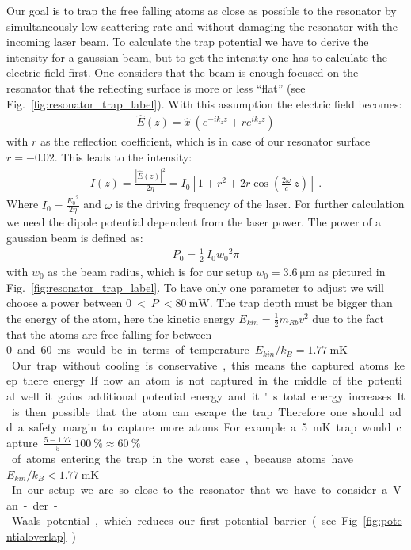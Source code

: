 Our goal is to trap the free falling atoms as close as possible to the resonator by
simultaneously low scattering rate and without damaging the resonator with the incoming
laser beam. To calculate the trap potential we have to derive the intensity for a
gaussian beam, but to get the intensity one has to calculate the electric field first.
One considers that the beam is enough focused on the resonator that the reflecting
surface is more or less ``flat'' (see Fig.~\ref{fig:resonator_trap_label}). With this 
assumption the electric field becomes:
\begin{align}
    \hat{E}(z) = \hat{x}~\left( e^{-i k_z z} + r e^{i k_z z} \right)
\end{align}
with \(r \) as the reflection coefficient, which is in case of our resonator surface
\(r = -0.02 \). This leads to the intensity:
\begin{align}
    I(z) = \frac{ { | \hat{E}(z) | }^2}{2\eta} =
    I_0 \left [ 1 + r^2 + 2r \cos{\left( \frac{2\omega}{c}~z \right) } \right ]~.
\end{align}
Where \(I_0 = \frac{{E_0}^2}{2\eta} \) and \(\omega \) is the driving frequency of the
laser. For further calculation we need the dipole potential dependent from the laser power.
The power of a gaussian beam is defined as:
\begin{align}
    P_0 = \frac{1}{2}~I_0 {w_0}^2 \pi
\end{align} 
with \(w_0 \) as the beam radius, which is for our setup \(w_0 = \SI{3.6}{\micro\meter} \) 
as pictured in Fig.~\ref{fig:resonator_trap_label}.
To have only one parameter to adjust we will choose a power between 
\(0~<~P~<\SI{80}{\milli\watt} \). The trap depth must be bigger than the energy of the
atom, here the kinetic energy \(E_{kin} = \frac{1}{2}m_{Rb} v^2 \) due to the fact that 
the atoms are free falling for between \SI{0} and \SI{60}{\milli\second} would be in terms of temperature 
\(E_{kin}/k_B = \SI{1.77}{\milli\kelvin} \). Our trap without cooling 
is conservative, this means the captured atoms keep there energy. If now an
atom is not captured in the middle of the potential well it gains additional 
potential energy and it's total energy increases. It is then possible that
the atom can escape the trap. Therefore one should add a safety margin to
capture more atoms. For example a \SI{5}{\milli\kelvin} trap would capture
 \(\frac{5-1.77}{5}~\SI{100}{\percent} \approx \SI{60}{\percent} \) 
of atoms entering the trap in the worst case, because atoms have
\(E_{kin}/k_B < \SI{1.77}{\milli\kelvin} \).
In our setup we are so close to the resonator that we have to consider a Van-der-Waals 
potential, which reduces our first potential barrier (see Fig.~\ref{fig:potentialoverlap}).\\

